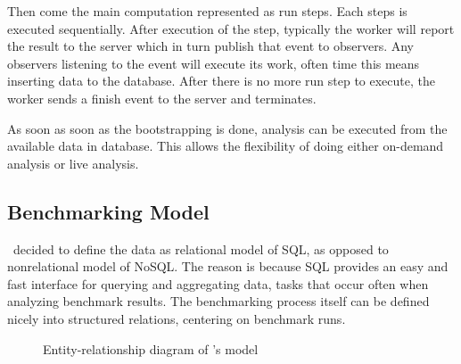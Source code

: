 Then come the main computation represented as run steps.
Each steps is executed sequentially.
After execution of the step, typically the worker will report the result to the server which in turn publish that event to observers.
Any observers listening to the event will execute its work, often time this means inserting data to the database. After there is no more run step to execute, the worker sends a finish event to the server and terminates.

As soon as soon as the bootstrapping is done, analysis can be executed from the available data in database.
This allows the flexibility of doing either on-demand analysis or live analysis.


\subsection{Benchmarking Model}

\First~decided to define the data as relational model of SQL, as opposed to nonrelational model of NoSQL.
The reason is because SQL provides an easy and fast interface for querying and aggregating data, tasks that occur often when analyzing benchmark results.
The benchmarking process itself can be defined nicely into structured relations, centering on benchmark runs.

\begin{figure}
    \centering
    \caption{Entity-relationship diagram of \OurBenchmarkingTool's model}
    \label{fig:erd}
\end{figure}

